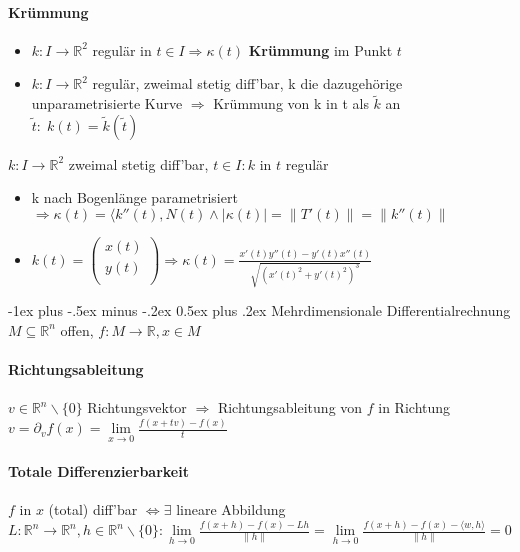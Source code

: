 \documentclass[paper=a3,paper=landscape, fontsize=9pt,DIV=25]{scrartcl}
\makeatletter
\newcommand{\real}{{\mathbb{R}}}
\renewcommand{\section}{\@startsection{section}{1}{0mm}%
  {-1ex plus -.5ex minus -.2ex}%
  {0.5ex plus .2ex}%
  {\color{blue}\normalfont\large\bfseries}}
\makeatother
\begin{document}
\begin{multicols*}{4}
  \paragraph{Krümmung}
  \begin{itemize}
  	\item $k: I \rightarrow \real^2$ regulär in $t \in I \Rightarrow \kappa(t)$ \textbf{Krümmung} im Punkt $t$
  	\item $k: I \rightarrow \real^2$ regulär, zweimal stetig diff'bar, k die dazugehörige unparametrisierte Kurve $\Rightarrow$ Krümmung von k in t als $\tilde{k}$ an $\tilde{t}:\;k(t)=\tilde{k}(\tilde{t})$
  \end{itemize}
	$k: I \rightarrow \real^2$ zweimal stetig diff'bar, $t \in I: k$ in $t$ regulär
	\begin{itemize}
		\item k nach Bogenlänge parametrisiert $\Rightarrow \kappa(t)=\langle k''(t), N(t) \wedge \lvert \kappa(t)\rvert = \lVert T'(t) \rVert = \lVert k''(t) \rVert$
		\item $k(t) = 
		\begin{pmatrix}
			x(t)\\y(t)\\
		\end{pmatrix}
		\Rightarrow \kappa(t)=\frac{x'(t)y''(t)-y'(t)x''(t)}{\sqrt{(x'(t)^2+y'(t)^2)^3}}$
	\end{itemize}
  \section{Mehrdimensionale Differentialrechnung}
	$M \subseteq \real^n$ offen, $f: M \rightarrow \real, x \in M$ 
	\paragraph{Richtungsableitung}
	$ v \in \real^n \backslash \{0\}$ Richtungsvektor $\Rightarrow$ Richtungsableitung von $f$ in Richtung $v = \partial_vf(x)= \lim\limits_{x \rightarrow 0} \frac{f(x+tv)-f(x)}{t}$
	
  \paragraph{Totale Differenzierbarkeit}
$f$ in $x$ (total) diff'bar $\Leftrightarrow \exists$ lineare Abbildung $L: \real^n \rightarrow \real^n, h \in \real^n \backslash \{0\}: \lim\limits_{h \rightarrow 0} \frac{f(x+h)-f(x)-Lh}{\lVert h \rVert} = \lim\limits_{h \rightarrow 0} \frac{f(x+h)-f(x)-\langle w,h \rangle}{\lVert h \rVert} = 0$


\end{multicols*}
\end{document}
